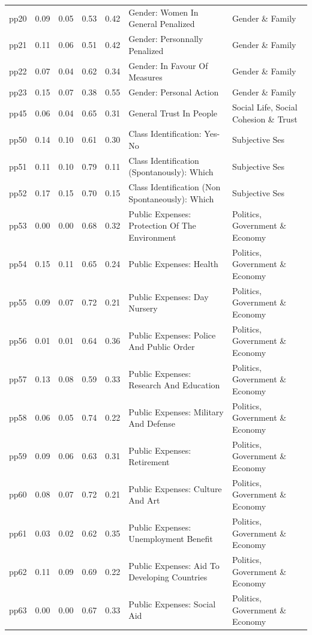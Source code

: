 \documentclass[
  12pt,
]{article}
\begin{document}
\begin{landscape}
\begin{scriptsize}
\begin{longtable}{|p{1.75in}|p{0.3in}|p{0.3in}|p{0.3in}|p{0.3in}|p{2.5in}|p{2.5in}}
pp20 & 0.09 & 0.05 & 0.53 & 0.42 & Gender: Women In General Penalized & Gender \& Family \\ 
pp21 & 0.11 & 0.06 & 0.51 & 0.42 & Gender: Personnally Penalized & Gender \& Family \\ 
pp22 & 0.07 & 0.04 & 0.62 & 0.34 & Gender: In Favour Of Measures & Gender \& Family \\ 
pp23 & 0.15 & 0.07 & 0.38 & 0.55 & Gender: Personal Action & Gender \& Family \\ 
pp45 & 0.06 & 0.04 & 0.65 & 0.31 & General Trust In People & Social Life, Social Cohesion \& Trust \\ 
pp50 & 0.14 & 0.10 & 0.61 & 0.30 & Class Identification: Yes-No & Subjective Ses \\ 
pp51 & 0.11 & 0.10 & 0.79 & 0.11 & Class Identification (Spontanously): Which & Subjective Ses \\ 
pp52 & 0.17 & 0.15 & 0.70 & 0.15 & Class Identification (Non Spontaneously): Which & Subjective Ses \\ 
pp53 & 0.00 & 0.00 & 0.68 & 0.32 & Public Expenses: Protection Of The Environment & Politics, Government \& Economy \\ 
pp54 & 0.15 & 0.11 & 0.65 & 0.24 & Public Expenses: Health & Politics, Government \& Economy \\ 
pp55 & 0.09 & 0.07 & 0.72 & 0.21 & Public Expenses: Day Nursery & Politics, Government \& Economy \\ 
pp56 & 0.01 & 0.01 & 0.64 & 0.36 & Public Expenses: Police And Public Order & Politics, Government \& Economy \\ 
pp57 & 0.13 & 0.08 & 0.59 & 0.33 & Public Expenses: Research And Education & Politics, Government \& Economy \\ 
pp58 & 0.06 & 0.05 & 0.74 & 0.22 & Public Expenses: Military And Defense & Politics, Government \& Economy \\ 
pp59 & 0.09 & 0.06 & 0.63 & 0.31 & Public Expenses: Retirement & Politics, Government \& Economy \\ 
pp60 & 0.08 & 0.07 & 0.72 & 0.21 & Public Expenses: Culture And Art & Politics, Government \& Economy \\ 
pp61 & 0.03 & 0.02 & 0.62 & 0.35 & Public Expenses: Unemployment Benefit & Politics, Government \& Economy \\ 
pp62 & 0.11 & 0.09 & 0.69 & 0.22 & Public Expenses: Aid To Developing Countries & Politics, Government \& Economy \\ 
pp63 & 0.00 & 0.00 & 0.67 & 0.33 & Public Expenses: Social Aid & Politics, Government \& Economy \\ 

\end{longtable}
\end{scriptsize}
\end{landscape}
\end{document}

